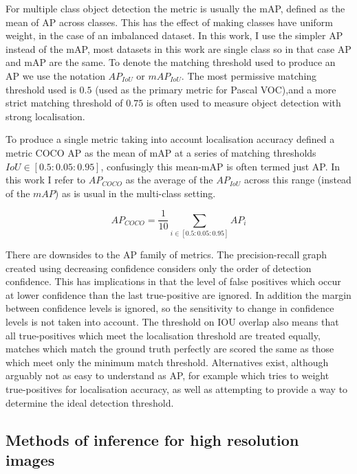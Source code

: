 For multiple class object detection the metric is usually the \gls{mAP}, defined as the mean of \gls{AP} across classes. This has the effect of making classes have uniform weight, in the case of an imbalanced dataset.  In this work, I use the simpler \gls{AP} instead of the \gls{mAP}, most  datasets in this work are single class so in that case \gls{AP} and \gls{mAP} are the same. To denote the matching threshold used to produce an \gls{AP} we use the notation $AP_{IoU}$ or $mAP_{IoU}$. The most permissive matching threshold used is $0.5$ (used as the primary metric for Pascal VOC),and a more strict matching threshold of $0.75$ is often used to measure object detection with strong localisation.

To produce a single metric taking into account localisation accuracy \cite{Lin2014} defined a metric COCO \gls{AP} as the mean of \gls{mAP} at a series of matching thresholds $ IoU \in [0.5 : 0.05 : 0.95] $, confusingly this mean-\gls{mAP} is often termed just \gls{AP}. In this work I refer to $AP_{COCO}$ as the average of the $AP_{IoU}$ across this range (instead of the $mAP$) as is usual in the multi-class setting.

\begin{equation}
AP_{COCO} = \frac{1}{10}\sum_{i \in [0.5 : 0.05 : 0.95]}AP_{i}
\label{eq:ap_coco}
\end{equation}

There are downsides to the \gls{AP} family of metrics. The precision-recall graph created using decreasing confidence considers only the order of detection confidence. This has implications in that the level of false positives which occur at lower confidence than the last true-positive are ignored. In addition the margin between confidence levels is ignored, so the sensitivity to change in confidence levels is not taken into account. The threshold on \gls{IOU} overlap also means that all true-positives which meet the localisation threshold are treated equally, matches which match the ground truth perfectly are scored the same as those which meet only the minimum match threshold. Alternatives exist, although arguably not as easy to understand as \gls{AP}, for example \cite{Oksuz2018} which tries to weight true-positives for localisation accuracy, as well as attempting to provide a way to determine the ideal detection threshold.


\subsection{Methods of inference for high resolution images}
\label{sec:highres_inference}

